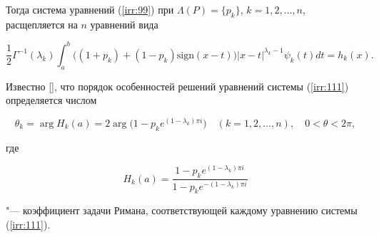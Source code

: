 Тогда система уравнений (\ref{irr:99}) при $\Lambda(P)=\{p_{k}\}$, $k=1, 2, \ldots, n$, расщепляется на $n$ уравнений вида












\begin{equation}\label{irr:111}

\frac{1}{2}\Gamma^{-1}(\lambda_{k})\int _{a}^{b}\bigl((1+p_{k})+(1-p_{k})\textrm{sign}(x-t)\bigr)|x-t|^{\lambda_{k}-1}\psi_{k}(t)dt=h_{k}(x).

\end{equation}









Известно [], что порядок особенностей решений уравнений системы (\ref{irr:111}) определяется числом

\begin{equation}

\theta_{k}=\arg H_{k}(a)=2\arg\bigl(1-p_{k}e^{(1-\lambda_{k})\pi i}\bigr) \quad (k=1,2,\ldots,n), \quad 0<\theta<2\pi,

\end{equation}

где 

$$H_{k}(a)=\frac{1-p_{k}e^{(1-\lambda_{k})\pi i}}{1-p_{k}e^{-(1-\lambda_{k})\pi i}}$$

"--- коэффициент задачи Римана, соответствующей каждому уравнению системы (\ref{irr:111}).





